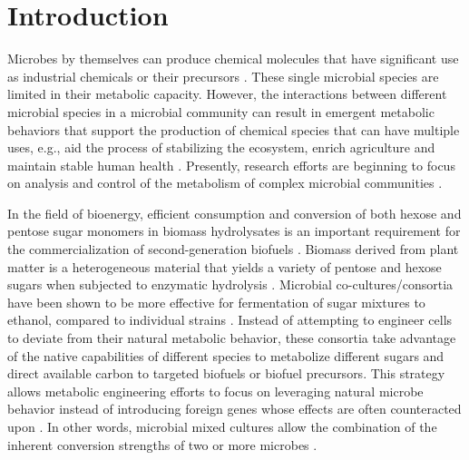 \chapter{Introduction}\label{chap:intro}
Microbes by themselves can produce chemical molecules that have significant use as industrial chemicals or their precursors \cite{Handelsman07, Fuhrman09}. These single microbial species are limited in their metabolic capacity. However, the interactions between different microbial species in a microbial community can result in emergent metabolic behaviors that support the production of chemical species that can have multiple uses, e.g., aid the process of stabilizing the ecosystem, enrich agriculture \cite{Kaye05} and maintain stable human health \cite{Ley10, Greenblum12, Qin12}. 
Presently, research efforts are beginning to focus on analysis and control of the metabolism of complex microbial communities \cite{Chiu14, Garcia16}.  %

 In the field of bioenergy, efficient consumption and conversion of  both hexose and pentose sugar monomers in biomass hydrolysates is an important requirement for the commercialization of second-generation biofuels \cite{Hanly14}. Biomass derived from plant matter is a heterogeneous material that yields a variety of pentose and hexose sugars when subjected to enzymatic hydrolysis \cite{Hanly11, Zaldivar01}. Microbial co-cultures/consortia have been shown to be more effective for fermentation of sugar mixtures to ethanol, compared to individual strains \cite{Lynd02, Hanly11}. Instead of attempting to engineer cells to deviate from their natural metabolic behavior, these consortia take advantage of the native capabilities of different species to metabolize different sugars and direct available carbon to targeted biofuels or biofuel precursors. This strategy allows metabolic engineering efforts to focus on leveraging natural microbe behavior instead of introducing foreign genes whose effects are often counteracted upon \cite{Hanly11, Kuyper05}. In other words, microbial mixed cultures allow the combination of the inherent conversion strengths of two or more microbes \cite{Hanly13, Brenner08}. 

